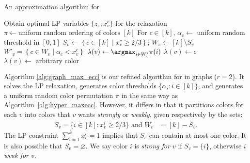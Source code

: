 \begin{algorithm}[t]
	\caption{An approximation algorithm for \maxecc{}}
	\label{alg:graph_max_ecc}
	\begin{algorithmic}
		\STATE Obtain optimal LP variables $\{z_e; x_v^c\}$ for the relaxation
		\STATE $\pi \leftarrow \text{uniform random ordering of colors } [k]$
		\STATE For $c \in [k]$, $\alpha_c \leftarrow $ uniform random threshold in $[0,1]$
		\STATE $S_v \leftarrow \left\{c \in [k] \mid x_v^c \geq 2/3 \right\}$; $W_v \leftarrow [k] \setminus S_v$
		\STATE $W'_v = \left\{ c \in W_v \mid \alpha_c < x_v^c \right\}$
		\STATE $\lambda(v) \leftarrow \argmax_{i \in W'_v} \pi(i)$
		\STATE $\lambda(v) \leftarrow c$
		\ELSE
		\STATE $\lambda(v) \leftarrow \text{ arbitrary color}$
		\ENDIF
		\ENDFOR
	\end{algorithmic}
\end{algorithm}
Algorithm \ref{alg:graph_max_ecc} is our refined algorithm for \maxecc{} in graphs ($r = 2$). It solves the LP relaxation, generates color thresholds $\{\alpha_i \colon i \in [k]\}$, and generates a uniform random color permutation $\pi$ in the same way as Algorithm~\ref{alg:hyper_maxecc}. However, it differs in that it partitions colors for each $v$ into colors that $v$ wants \emph{strongly} or \emph{weakly}, given respectively by the sets:
\begin{align*}
	S_v = \{ i \in [k] \colon x_v^i \geq 2/3\} \text{ and } W_v &= [k] - S_v.
\end{align*}
The LP constraint $\sum_{i = 1}^k x_v^i = 1$ implies that $S_v$ can contain at most one color. It is also possible that $S_v = \varnothing$. We say color $i$ is \textit{strong for $v$} if $S_v = \{i\}$, otherwise $i$ \textit{weak for $v$}.

